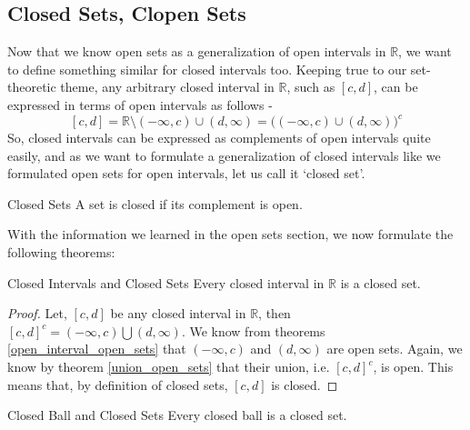 \subsection{Closed Sets, Clopen Sets}
Now that we know open sets as a generalization of open intervals in $\mathbb{R}$, we want to define something similar for closed intervals too. Keeping true to our set-theoretic theme, any arbitrary closed interval in $\mathbb{R}$, such as $[c,d]$, can be expressed in terms of open intervals as follows -
$$[c,d]=\mathbb{R}\setminus(-\infty,c)\cup(d,\infty)=\big((-\infty,c)\cup(d,\infty)\big)^c$$
So, closed intervals can be expressed as complements of open intervals quite easily, and as we want to formulate a generalization of closed intervals like we formulated open sets for open intervals, let us call it `closed set'.
\begin{Definition}{Closed Sets}\label{closed_set}
    A set is closed if its complement is open.
\end{Definition}
\noindent With the information we learned in the open sets section, we now formulate the following theorems:
\begin{Theorem}{Closed Intervals and Closed Sets}\label{closed_intervals_closed_sets}
    Every closed interval in $\mathbb{R}$ is a closed set.
\end{Theorem}
\begin{proof}
    Let, $[c,d]$ be any closed interval in $\mathbb{R}$, then $[c,d]^c=(-\infty,c)\bigcup(d,\infty)$. We know from theorems \eqref{open_interval_open_sets} that $(-\infty,c)$ and $(d,\infty)$ are open sets. Again, we know by theorem \eqref{union_open_sets} that their union, i.e. $[c,d]^c$, is open. This means that, by definition of closed sets, $[c,d]$ is closed.
\end{proof}
\begin{Theorem}{Closed Ball and Closed Sets}\label{closed_ball_closed_set}
    Every closed ball is a closed set.
\end{Theorem}
